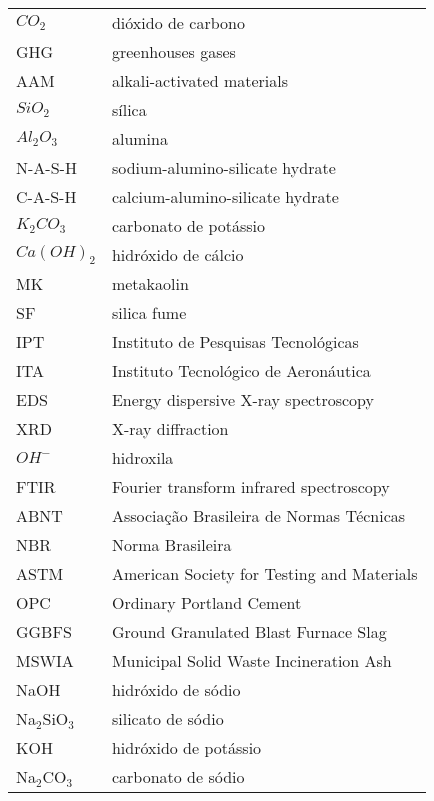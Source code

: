 \begin{longtable}{ll}
$CO_2$ & dióxido de carbono \\
GHG & greenhouses gases \\
AAM & alkali-activated materials \\
$ SiO_2$ & sílica \\
$ Al_2O_3$ & alumina \\
N-A-S-H & sodium-alumino-silicate hydrate \\
C-A-S-H & calcium-alumino-silicate hydrate \\
$K_2CO_3$ & carbonato de potássio \\
$Ca(OH)_2$ & hidróxido de cálcio \\
MK & metakaolin \\
SF & silica fume \\
IPT & Instituto de Pesquisas Tecnológicas \\
ITA & Instituto Tecnológico de Aeronáutica \\
EDS & Energy dispersive X-ray spectroscopy \\
XRD & X-ray diffraction \\
$OH^-$ & hidroxila \\
FTIR & Fourier transform infrared spectroscopy \\
ABNT & Associação Brasileira de Normas Técnicas \\
NBR & Norma Brasileira \\
ASTM & American Society for Testing and Materials \\
OPC & Ordinary Portland Cement \\
GGBFS & Ground Granulated Blast Furnace Slag \\
MSWIA & Municipal Solid Waste Incineration Ash \\
NaOH & hidróxido de sódio \\
Na$_2$SiO$_3$ & silicato de sódio \\
KOH & hidróxido de potássio \\
Na$_2$CO$_3$ & carbonato de sódio \\

\end{longtable}